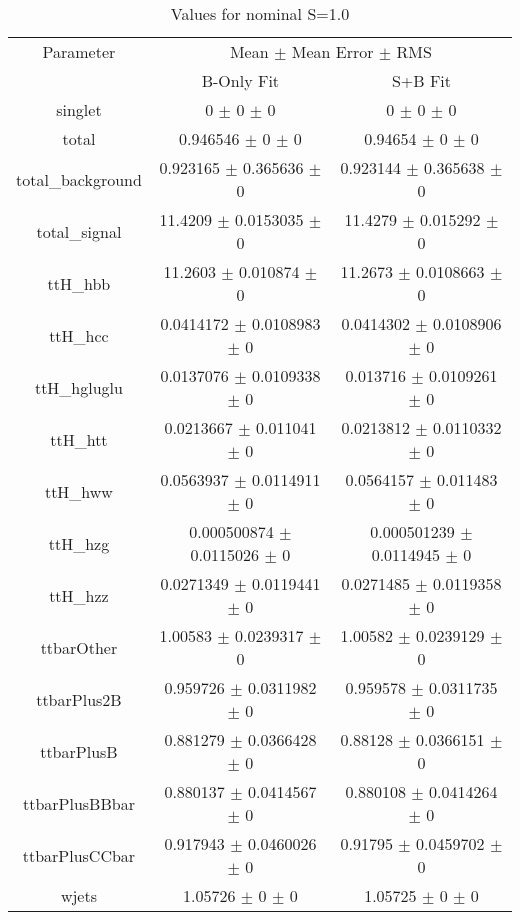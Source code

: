 \begin{table}
\centering
\caption{Values for nominal S=1.0}
\begin{tabular}{ccc}
\toprule
Parameter & \multicolumn{2}{c}{Mean $\pm$ Mean Error $\pm$ RMS}\\
 & B-Only Fit & S+B Fit\\
\midrule
singlet & \num{0} $\pm$ \num{0} $\pm$ \num{0} & \num{0} $\pm$ \num{0} $\pm$ \num{0}\\
total & \num{0.946546} $\pm$ \num{0} $\pm$ \num{0} & \num{0.94654} $\pm$ \num{0} $\pm$ \num{0}\\
total\_background & \num{0.923165} $\pm$ \num{0.365636} $\pm$ \num{0} & \num{0.923144} $\pm$ \num{0.365638} $\pm$ \num{0}\\
total\_signal & \num{11.4209} $\pm$ \num{0.0153035} $\pm$ \num{0} & \num{11.4279} $\pm$ \num{0.015292} $\pm$ \num{0}\\
ttH\_hbb & \num{11.2603} $\pm$ \num{0.010874} $\pm$ \num{0} & \num{11.2673} $\pm$ \num{0.0108663} $\pm$ \num{0}\\
ttH\_hcc & \num{0.0414172} $\pm$ \num{0.0108983} $\pm$ \num{0} & \num{0.0414302} $\pm$ \num{0.0108906} $\pm$ \num{0}\\
ttH\_hgluglu & \num{0.0137076} $\pm$ \num{0.0109338} $\pm$ \num{0} & \num{0.013716} $\pm$ \num{0.0109261} $\pm$ \num{0}\\
ttH\_htt & \num{0.0213667} $\pm$ \num{0.011041} $\pm$ \num{0} & \num{0.0213812} $\pm$ \num{0.0110332} $\pm$ \num{0}\\
ttH\_hww & \num{0.0563937} $\pm$ \num{0.0114911} $\pm$ \num{0} & \num{0.0564157} $\pm$ \num{0.011483} $\pm$ \num{0}\\
ttH\_hzg & \num{0.000500874} $\pm$ \num{0.0115026} $\pm$ \num{0} & \num{0.000501239} $\pm$ \num{0.0114945} $\pm$ \num{0}\\
ttH\_hzz & \num{0.0271349} $\pm$ \num{0.0119441} $\pm$ \num{0} & \num{0.0271485} $\pm$ \num{0.0119358} $\pm$ \num{0}\\
ttbarOther & \num{1.00583} $\pm$ \num{0.0239317} $\pm$ \num{0} & \num{1.00582} $\pm$ \num{0.0239129} $\pm$ \num{0}\\
ttbarPlus2B & \num{0.959726} $\pm$ \num{0.0311982} $\pm$ \num{0} & \num{0.959578} $\pm$ \num{0.0311735} $\pm$ \num{0}\\
ttbarPlusB & \num{0.881279} $\pm$ \num{0.0366428} $\pm$ \num{0} & \num{0.88128} $\pm$ \num{0.0366151} $\pm$ \num{0}\\
ttbarPlusBBbar & \num{0.880137} $\pm$ \num{0.0414567} $\pm$ \num{0} & \num{0.880108} $\pm$ \num{0.0414264} $\pm$ \num{0}\\
ttbarPlusCCbar & \num{0.917943} $\pm$ \num{0.0460026} $\pm$ \num{0} & \num{0.91795} $\pm$ \num{0.0459702} $\pm$ \num{0}\\
wjets & \num{1.05726} $\pm$ \num{0} $\pm$ \num{0} & \num{1.05725} $\pm$ \num{0} $\pm$ \num{0}\\
\bottomrule
\end{tabular}
\end{table}